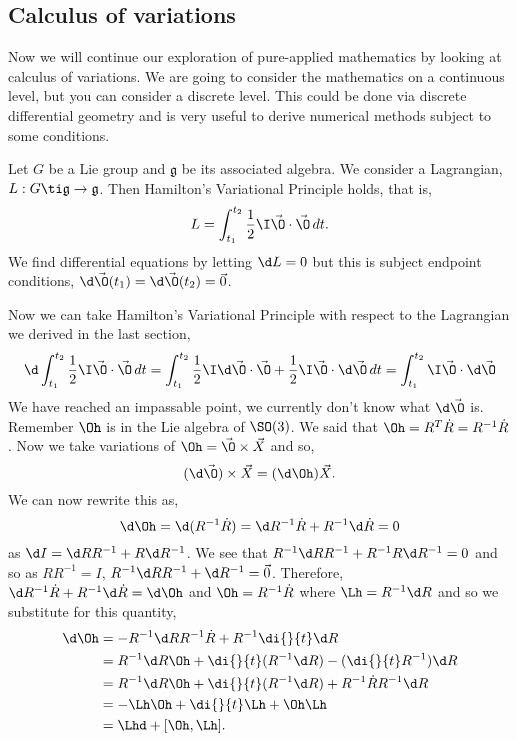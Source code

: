 
\subsection{Calculus of variations}
Now we will continue our exploration of pure-applied mathematics by looking at calculus of variations. We are going to consider the mathematics on a continuous level, but you can consider a discrete level. This could be done via discrete differential geometry and is very useful to derive numerical methods subject to some conditions.
\begin{nthm}
  Let $G$ be a Lie group and $\mathfrak{g}$ be its associated algebra. We consider a Lagrangian, $L : G \ti \mathfrak{g} \to \mathfrak{g}$. Then Hamilton's Variational Principle holds, that is,
  $$ L = \int_{t_1}^{t_2} \frac{1}{2}\I\vec \O \cdot \vec\O \,dt. $$
  We find differential equations by letting $\d L = 0$ but this is subject endpoint conditions, $\d\vec\O(t_1) = \d\vec\O(t_2) = \vec 0$.
\end{nthm}
\noindent
Now we can take Hamilton's Variational Principle with respect to the Lagrangian we derived in the last section,
$$ \d\int_{t_1}^{t_2} \frac{1}{2}\I\vec\O \cdot \vec\O\, dt = \int_{t_1}^{t_2} \frac{1}{2}\I\d\vec\O \cdot \vec\O + \frac{1}{2}\I\vec\O \cdot \d\vec\O \, dt  = \int_{t_1}^{t_2}\I\vec\O \cdot \d\vec\O$$
We have reached an impassable point, we currently don't know what $\d\vec\O$ is. Remember $\Oh$ is in the Lie algebra of $\SO(3)$. We said that $\Oh = R^T\dot R = R^{-1}\dot R$. Now we take variations of $\Oh = \vec\O \times \vec X$ and so,
$$ (\d \vec \O)\times\vec X = (\d\Oh) \vec X. $$
We can now rewrite this as,
$$ \d\Oh = \d(R^{-1}\dot R) = \d R^{-1}\dot R + R^{-1}\d\dot R = 0 $$
as $\d I = \d RR^{-1} + R\d R^{-1}$. We see that $R^{-1}\d R R^{-1} + R^{-1}R \d R^{-1} = 0$ and so as $RR^{-1} = I$, $R^{-1}\d RR^{-1} + \d R^{-1} = \vec 0$. Therefore, $\d R^{-1}\dot R + R^{-1}\d \dot R = \d \Oh$
and $\Oh = R^{-1}\dot R$ where $\Lh = R^{-1}\d R$ and so we substitute for this quantity,
\begin{align*}
  \d\Oh &= -R^{-1}\d R R^{-1}\dot R + R^{-1}\di{}{t}\d R\\
  &= R^{-1}\d R \Oh + \di{}{t}(R^{-1}\d R) - (\di{}{t}R^{-1})\d R\\
  &= R^{-1}\d R \Oh + \di{}{t}(R^{-1}\d R) + R^{-1}\dot R R^{-1}\d R\\
  &= - \Lh\Oh + \di{}{t}\Lh + \Oh\Lh\\
  &=\Lhd + [\Oh, \Lh].
\end{align*}

